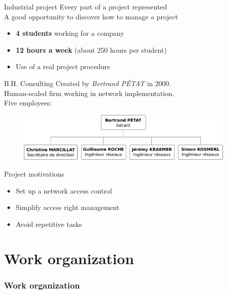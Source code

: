 \documentclass[12pt]{beamer}
\begin{document}
\begin{frame}{Industrial project}
    Every part of a project represented\\
    \vfill
    A good opportunity to discover how to manage a project
    \vfill
    \begin{itemize}
	\item \textbf{4 students} working for a company
	\item \textbf{12 hours a week} (about 250 hours per student)
	\item Use of a real project procedure
    \end{itemize}
\end{frame}


    
\begin{frame}{B.H. Consulting}
    Created by \emph{Bertrand PÉTAT} in 2000.\\
    \vfill
    Human-scaled firm working in network implementation.\\
    \vfill
    Five employees:
    \begin{figure}
	\includegraphics[width=300pt]{img/organigramme.pdf}
    \end{figure}
\end{frame}


\begin{frame}{Project motivations}
    \begin{itemize}
	\item<1->Set up a network access control 
	\vfill
	\item<2->Simplify access right management
	\vfill
	\item<3->Avoid repetitive tasks
    \end{itemize}

\end{frame}
    
\part{Work organization}
\frame{\partpage}
\section{Work organization}
\end{document}
